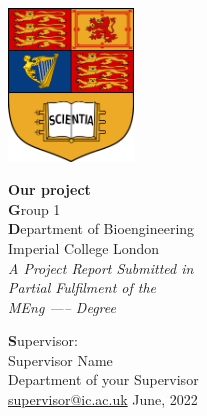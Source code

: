 \begin{titlepage}

\begin{center}

\includegraphics[width=0.25\textwidth]{img/collegecrest.png}\\
\vspace{3em}

\Huge\textbf{Our project}\\
\vspace{1em}
{\normalsize {\textbf Group 1}\\}
 \vspace{1em}
{\Large{\textbf Department of Bioengineering \\ Imperial College London}}\\[0.5in]

{\large\emph{A Project Report Submitted in \\Partial Fulfilment of the\\ MEng ----- Degree}}
\vspace{1in}

      
\normalsize {\textbf Supervisor:} \\
Supervisor Name\\
\vspace{1em}
Department of your Supervisor \\
\url{supervisor@ic.ac.uk}
\vfill
June, 2022
\end{center}
\end{titlepage}
